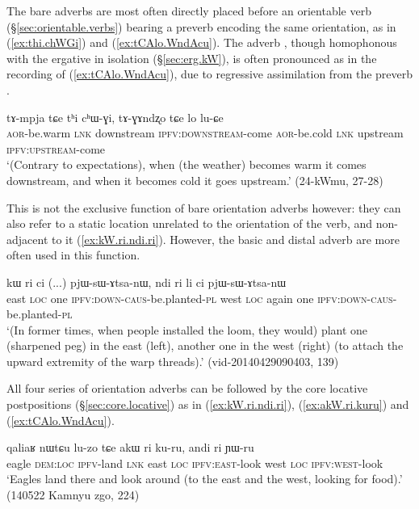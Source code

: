 The bare adverbs are most often directly placed before an orientable verb (§\ref{sec:orientable.verbs}) bearing a preverb encoding the same orientation, as in (\ref{ex:thi.chWGi}) and (\ref{ex:tCAlo.WndAcu}). The adverb , though homophonous with the ergative in isolation (§\ref{sec:erg.kW}), is often pronounced  as in the recording of (\ref{ex:tCAlo.WndAcu}), due to regressive assimilation from the preverb .

 \begin{exe}
\ex \label{ex:thi.chWGi}
\gll tɤ-mpja tɕe tʰi cʰɯ-ɣi, tɤ-ɣɤndʐo tɕe lo lu-ɕe \\
\textsc{aor}-be.warm \textsc{lnk} downstream \textsc{ipfv}:\textsc{downstream}-come \textsc{aor}-be.cold  \textsc{lnk} upstream \textsc{ipfv}:\textsc{upstream}-come \\
\glt `(Contrary to expectations), when (the weather) becomes warm it comes downstream, and when it becomes cold it goes upstream.' (24-kWmu, 27-28)
 \end{exe}

This is not the exclusive function of bare orientation adverbs however: they can also refer to a static location unrelated to the orientation of the verb, and non-adjacent to it (\ref{ex:kW.ri.ndi.ri}). However, the basic and distal adverb are more often used in this function.

\begin{exe}
\ex \label{ex:kW.ri.ndi.ri}
\gll kɯ ri ci (...) pjɯ-sɯ-ɤtsa-nɯ, ndi ri li ci pjɯ-sɯ-ɤtsa-nɯ   \\
east \textsc{loc} one {  } \textsc{ipfv}:\textsc{down}-\textsc{caus}-be.planted-\textsc{pl} 
west \textsc{loc} again one \textsc{ipfv}:\textsc{down}-\textsc{caus}-be.planted-\textsc{pl}  \\
\glt `(In former times, when people installed the loom, they would) plant one (sharpened peg) in the east (left), another one in the west (right) (to attach the upward extremity of the warp threads).' (vid-20140429090403, 139)
 \end{exe}
 
All four series of orientation adverbs can be followed by the core locative postpositions (§\ref{sec:core.locative}) as in (\ref{ex:kW.ri.ndi.ri}), (\ref{ex:akW.ri.kuru}) and (\ref{ex:tCAlo.WndAcu}).

 \begin{exe}
\ex \label{ex:akW.ri.kuru}
\gll qaliaʁ nɯtɕu lu-zo tɕe akɯ ri ku-ru, andi ri ɲɯ-ru   \\
eagle \textsc{dem}:\textsc{loc} \textsc{ipfv}-land \textsc{lnk} east \textsc{loc} \textsc{ipfv}:\textsc{east}-look west \textsc{loc} \textsc{ipfv}:\textsc{west}-look \\
\glt `Eagles land there and look around (to the east and the west, looking for food).' (140522 Kamnyu zgo, 224)
 \end{exe}
 
